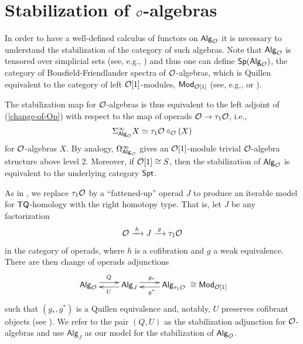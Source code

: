 \section{Stabilization of $\mathcal{O}$-algebras}
\label{sec:stab}In order to have a well-defined calculus of functors on ${\mathsf{Alg}_{\mathcal{O}}}$ it is necessary to understand the stabilization of the category of such algebras. Note that ${\mathsf{Alg}_{\mathcal{\mathcal{O}}}}$ is tensored over simplicial sets (see, e.g.,  \cite[]{Ching-Harper-Koszul}) and thus one can define $\mathsf{Sp}({\mathsf{Alg}_{\mathcal{O}}})$, the category of Bousfield-Friendlander spectra of $\mathcal{O}$-algebras, which is Quillen equivalent to the category of left $\mathcal{O}[1]$-modules, $\mathsf{Mod}_{\mathcal{O}[1]}$ (see, e.g.,  \cite{Bast-Man} or \cite[]{Per-thesis}). 

The stabilization map for $\mathcal{O}$-algebras is thus equivalent to the left adjoint of (\ref{change-of-Op}) with respect to the map of operads $\mathcal{O}\to \tau_1\mathcal{O}$, i.e., \[\Sigma^{\infty}_{{\mathsf{Alg}_{\mathcal{O}}}} X\simeq \tau_1\mathcal{O} \circ_{\mathcal{O}} (X)\] for $\mathcal{O}$-algebras $X$. By analogy, $\Omega^{\infty}_{{\mathsf{Alg}_{\mathcal{O}}}}$ gives an $\mathcal{O}[1]$-module trivial $\mathcal{O}$-algebra structure above level $2$. Moreover, if $\mathcal{O}[1]\cong S$, then the stabilization of ${\mathsf{Alg}_{\mathcal{O}}}$ is equivalent to the underlying category $\mathsf{Spt}$. 

As in \cite{Ching-Harper-Koszul}, we replace $\tau_1\mathcal{O}$ by a ``fattened-up'' operad $J$ to produce an iterable model for $\mathsf{TQ}$-homology with the right homotopy type. That is, let $J$ be any factorization \[\mathcal{O}\xrightarrow{\; h\;} J \xrightarrow{\; g \;} \tau_1 \mathcal{O}\] in the category of operads, where $h$ is a cofibration and $g$ a weak equivalence. There are then change of operads adjunctions \begin{equation} \label{stab-of-O-alg}
    \xymatrix{
    \Alg{O} \ar@<.75 ex>[r]^{Q} &
    \mathsf{Alg}_{J} \ar@<.5 ex>[l]^{U} \ar@<.75ex>[r]^{g_*} &
    \mathsf{Alg}_{\tau_1\Cal{O}} \ar@<.5ex>[l]^{g^*}
    }  \cong \mathsf{Mod}_{\Cal{O}[1]}
\end{equation}
such that $(g_*,g^*)$ is a Quillen equivalence and, notably, $U$ preserves cofibrant objects (see \cite[5.49]{Har-Hess}). We refer to the pair $(Q,U)$ as the stabilization adjunction for $\mathcal{O}$-algebras and use $\mathsf{Alg}_J$ as our model for the stabilization of ${\mathsf{Alg}_{\mathcal{O}}}$.
